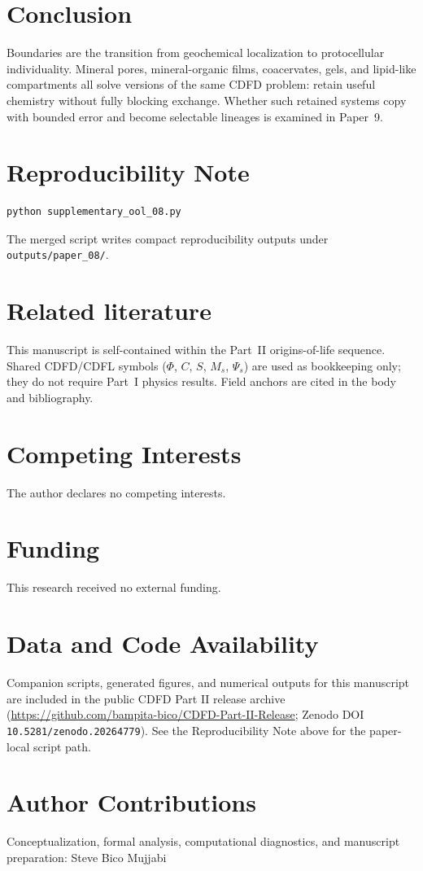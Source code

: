 \documentclass[11pt,a4paper]{article}
\begin{document}
\section{Conclusion}
Boundaries are the transition from geochemical localization to protocellular individuality. Mineral pores, mineral-organic films, coacervates, gels, and lipid-like compartments all solve versions of the same CDFD problem: retain useful chemistry without fully blocking exchange. Whether such retained systems copy with bounded error and become selectable lineages is examined in Paper~9.

\section{Reproducibility Note}
\begin{verbatim}
python supplementary_ool_08.py
\end{verbatim}
The merged script writes compact reproducibility outputs under \texttt{outputs/paper\_08/}.

\section*{Related literature}
This manuscript is self-contained within the Part~II origins-of-life sequence. Shared CDFD/CDFL symbols ($\Phi$, $C$, $S$, $M_s$, $\Psi_s$) are used as bookkeeping only; they do not require Part~I physics results. Field anchors are cited in the body and bibliography.

\section*{Competing Interests}
The author declares no competing interests.

\section*{Funding}
This research received no external funding.

\section*{Data and Code Availability}
Companion scripts, generated figures, and numerical outputs for this manuscript are included in the public CDFD Part II release archive (\url{https://github.com/bampita-bico/CDFD-Part-II-Release}; Zenodo DOI \texttt{10.5281/zenodo.20264779}). See the Reproducibility Note above for the paper-local script path.

\section*{Author Contributions}
Conceptualization, formal analysis, computational diagnostics, and manuscript preparation: Steve Bico Mujjabi



\end{document}
